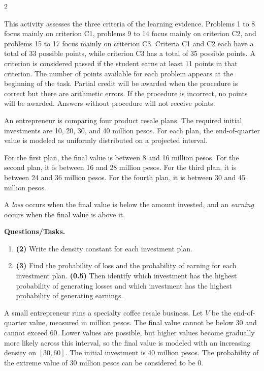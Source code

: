 	\begin{multicols}{2}
		
		\vspace{-0.3cm}
		This activity assesses the three criteria of the learning evidence. Problems 1 to 8 focus mainly on criterion C1, problems 9 to 14 focus mainly on criterion C2, and problems 15 to 17 focus mainly on criterion C3. Criteria C1 and C2 each have a total of 33 possible points, while criterion C3 has a total of 35 possible points. A criterion is considered passed if the student earns at least 11 points in that criterion. The number of points available for each problem appears at the beginning of the task. Partial credit will be awarded when the procedure is correct but there are arithmetic errors. If the procedure is incorrect, no points will be awarded. Answers without procedure will not receive points.
		
		\vspace{0.15cm}
		\vspace{-0.3cm}
		An entrepreneur is comparing four product resale plans. The required initial investments are 10, 20, 30, and 40 million pesos. For each plan, the end-of-quarter value is modeled as uniformly distributed on a projected interval.
		
		For the first plan, the final value is between 8 and 16 million pesos. For the second plan, it is between 16 and 28 million pesos. For the third plan, it is between 24 and 36 million pesos. For the fourth plan, it is between 30 and 45 million pesos.
		
		A \emph{loss} occurs when the final value is below the amount invested, and an \emph{earning} occurs when the final value is above it.
		
		\textbf{Questions/Tasks.}
		\begin{enumerate}[label=\textbf{\alph*)}]
			\item \textbf{(2)} Write the density constant for each investment plan.
			\item \textbf{(3)} Find the probability of loss and the probability of earning for each investment plan. \textbf{(0.5)} Then identify which investment has the highest probability of generating losses and which investment has the highest probability of generating earnings.
		\end{enumerate}
		
		\vspace{0.15cm}
		\vspace{-0.3cm}
		A small entrepreneur runs a specialty coffee resale business. Let $V$ be the end-of-quarter value, measured in million pesos. The final value cannot be below $30$ and cannot exceed $60$. Lower values are possible, but higher values become gradually more likely across this interval, so the final value is modeled with an increasing density on $[30,60]$. The initial investment is $40$ million pesos. The probability of the extreme value of 30 million pesos can be considered to be 0.
		

\end{multicols}
